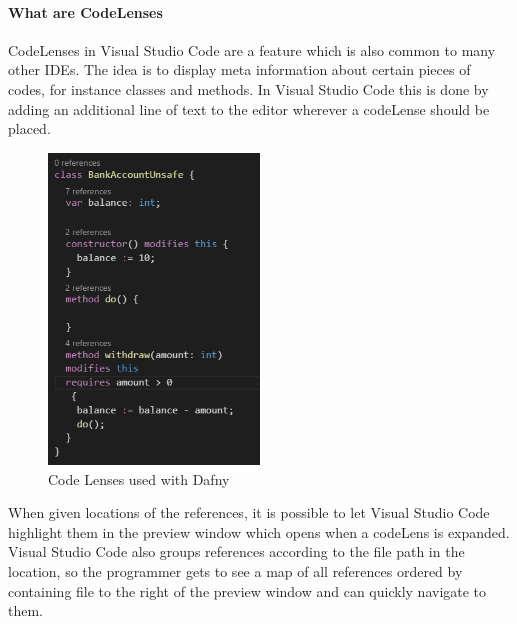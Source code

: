 \paragraph{What are CodeLenses}
CodeLenses in Visual Studio Code are a feature which is also common to many other IDEs. The idea is to display meta information about certain pieces of codes, for instance classes and methods. In Visual Studio Code this is done  by adding an additional line of text to the editor wherever a codeLense should  be placed. \newline
\begin{figure}[H]
	\centering
	\includegraphics[width=0.5\textwidth]{img/codelensesClosed}
	\caption{Code Lenses used with Dafny}
	\label{fig:agcodelensesclosed}
\end{figure}
When given locations of the references, it is possible to let Visual Studio Code highlight them in the preview window which opens when a codeLens is expanded. Visual Studio Code also groups references according to the file path in the location, so the programmer gets to see a map of all references ordered by containing file to the right of the preview window and can quickly navigate to them.
